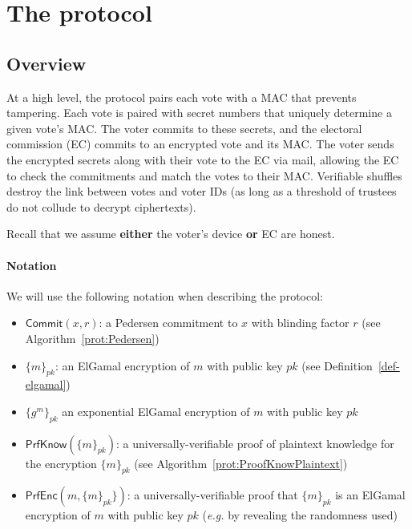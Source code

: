 \documentclass[12pt,a4paper]{article}
\newcommand{\commit}{\mathsf{Commit}}
\theoremstyle{definition}
\newcommand{\eg}{\textit{e.g. }}
\begin{document}
\section{The protocol}\label{sec-protocol}
\subsection{Overview}
At a high level, the protocol pairs each vote with a MAC that prevents tampering. Each vote is paired with secret numbers that uniquely determine a given vote's MAC. The voter commits to these secrets, and the electoral commission (EC) commits to an encrypted vote and its MAC. The voter sends the encrypted secrets along with their vote to the EC via mail, allowing the EC to check the commitments and match the votes to their MAC. Verifiable shuffles destroy the link between votes and voter IDs (as long as a threshold of trustees do not collude to decrypt ciphertexts).

Recall that we assume \textbf{either} the voter's device \textbf{or} EC are honest.

\paragraph{Notation}
We will use the following notation when describing the protocol:
\begin{itemize}
    \item $\commit(x, r)$: a Pedersen commitment to $x$ with blinding factor $r$ (see Algorithm~\ref{prot:Pedersen})
    \item $\{m\}_{pk}$: an ElGamal encryption of $m$ with public key $pk$ (see Definition~\ref{def-elgamal})
    \item $\{g^m\}_{pk}$ an exponential ElGamal encryption of $m$ with public key $pk$
    \item $\mathsf{PrfKnow}(\{m\}_{pk})$: a universally-verifiable proof of plaintext knowledge for the encryption $\{m\}_{pk}$ (see Algorithm~\ref{prot:ProofKnowPlaintext})
    \item $\mathsf{PrfEnc}(m, \{m\}_{pk}\})$: a universally-verifiable proof that $\{m\}_{pk}$ is an ElGamal encryption of $m$ with public key $pk$ (\eg by revealing the randomness used)
\end{itemize}
\end{document}
